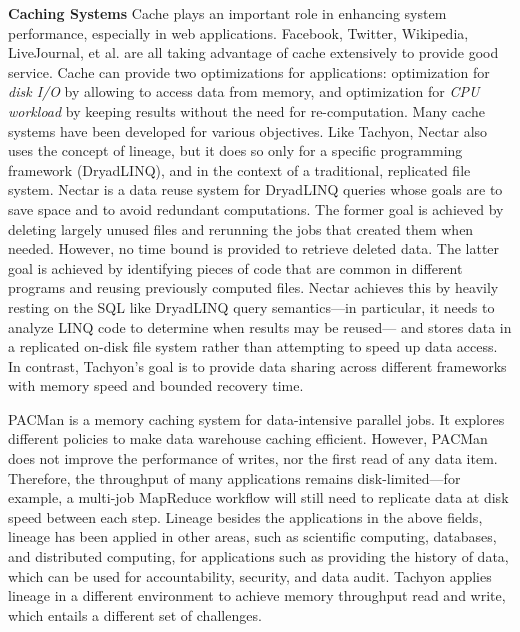 \documentclass[twocolumn]{article}
\begin{document}
\noindent
\textbf{Caching Systems}
Cache plays an important role in enhancing system performance, especially in web applications. 
Facebook, Twitter, Wikipedia, LiveJournal, et al. are all taking advantage of cache extensively to provide good service. 
Cache can provide two optimizations for applications: optimization for \textit{disk I/O} by allowing to access data from
memory, and optimization for \textit{CPU workload} by keeping results without the need for re-computation. 
Many cache systems have been developed for various objectives.
Like Tachyon, Nectar also uses the concept of lineage, but it does so only for a specific programming framework (DryadLINQ), and in the context of a traditional, replicated file system. 
Nectar is a data reuse system for DryadLINQ queries whose goals are to save space and to avoid redundant computations. The former goal is achieved by deleting largely unused files and rerunning the jobs that created them when needed. However, no time bound is provided to retrieve deleted data. The latter goal is achieved by identifying pieces of code that are common in different programs and reusing previously computed files. Nectar achieves this by heavily resting on the SQL like DryadLINQ query semantics—in particular, it needs to analyze LINQ code to determine when results may be reused— and stores data in a replicated on-disk file system rather than attempting to speed up data access. In contrast, Tachyon’s goal is to provide data sharing across different frameworks with memory speed and bounded recovery time.

PACMan \cite{Anan:2012} is a memory caching system for data-intensive parallel jobs. It explores different policies to make data warehouse caching efficient. However, PACMan does not improve the performance of writes, nor the first read of any data item. Therefore, the throughput of many applications remains disk-limited—for example, a multi-job MapReduce workflow will still need to replicate data at disk speed between each step.
Lineage besides the applications in the above fields, lineage has been applied in other areas, such as scientific computing, databases, and distributed computing, for applications such as providing the history of data, which can be used for accountability, security, and data audit. Tachyon applies lineage in a different environment to achieve memory throughput read and write, which entails a different set of challenges.
\end{document}
